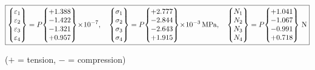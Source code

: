 \documentclass[11pt, a4paper]{article}
\begin{document}
\begin{equation}\label{eq:strains}
\boxed{
\begin{Bmatrix} \varepsilon_1 \\ \varepsilon_2 \\ \varepsilon_3 \\ \varepsilon_4 \end{Bmatrix}
= P\!
\begin{Bmatrix} +1.388 \\ -1.422 \\ -1.321 \\ +0.957 \end{Bmatrix}
\!\times\! 10^{-7},
\quad
\begin{Bmatrix} \sigma_1 \\ \sigma_2 \\ \sigma_3 \\ \sigma_4 \end{Bmatrix}
= P\!
\begin{Bmatrix} +2.777 \\ -2.844 \\ -2.643 \\ +1.915 \end{Bmatrix}
\!\times\! 10^{-3}\text{\,MPa},
\quad
\begin{Bmatrix} N_1 \\ N_2 \\ N_3 \\ N_4 \end{Bmatrix}
= P\!
\begin{Bmatrix} +1.041 \\ -1.067 \\ -0.991 \\ +0.718 \end{Bmatrix}
\text{\,N}
}
\end{equation}

\noindent ($+$ = tension, $-$ = compression)
\end{document}
